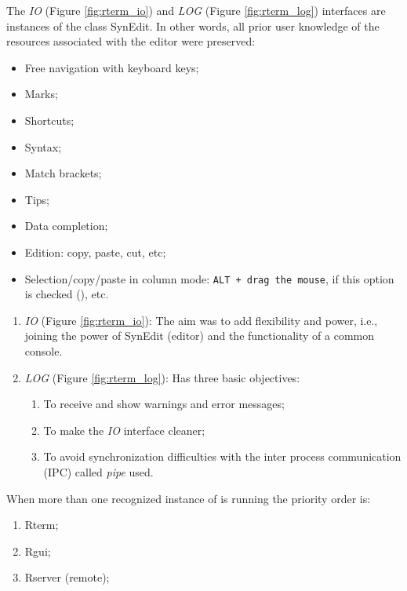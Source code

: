 The \textit{IO}
(Figure \ref{fig:rterm_io})
and \textit{LOG}
(Figure \ref{fig:rterm_log})
interfaces are instances of the class
SynEdit. In other words, all prior user knowledge of the resources associated with the editor were preserved:

\begin{itemize}
  \item Free navigation with keyboard keys;
  \item Marks;
  \item Shortcuts;
  \item Syntax;
  \item Match brackets;
  \item Tips;
  \item Data completion;
  \item Edition: copy, paste, cut, etc;
  \item Selection/copy/paste in column mode:
    \texttt{ALT + drag the mouse}, if this option is checked
    (), etc.
\end{itemize}

\begin{enumerate}
  \item \textit{IO} (Figure \ref{fig:rterm_io}): The aim was to add flexibility and power, i.e.,
    joining the power of SynEdit (editor) and the functionality of
    a common console.
  \item \textit{LOG} (Figure \ref{fig:rterm_log}): Has three basic objectives:
    \begin{enumerate}
      \item To receive and show warnings and error messages;
      \item To make the \textit{IO} interface cleaner;
      \item To avoid synchronization difficulties with the inter
        process communication (IPC) called \textit{pipe} used.
    \end{enumerate}
\end{enumerate}

When more than one recognized instance of \RR{} is running the priority
order is:

\begin{enumerate}
  \item Rterm;
  \item Rgui;
  \item Rserver (remote);
\end{enumerate}


